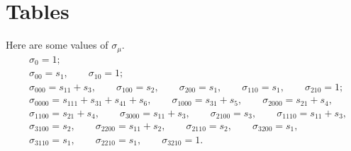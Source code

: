 \documentclass[12pt]{amsart}
\theoremstyle{plain}
\theoremstyle{definition}
\theoremstyle{remark}
\begin{document}
\section{Tables}
Here are some values of $\sigma_\mu$.
\begin{align*}
&\sigma_{0} =1; \\[8pt]
&\sigma_{00} =s_{1},\qquad   \sigma_{10} =1; \\[8pt] 
&\sigma_{000} =s_{11} + s_{3},\qquad   
\sigma_{100} =s_{2},\qquad    
\sigma_{200} =s_{1},\qquad    
\sigma_{110} =s_{1},\qquad    
\sigma_{210} =1;\\[8pt] 
&\sigma_{0000} =s_{111} + s_{31} + s_{41} + s_{6},\qquad 
\sigma_{1000} =s_{31} + s_{5},\qquad 
\sigma_{2000} =s_{21} + s_{4},\\ 
&\sigma_{1100} =s_{21} + s_{4},\qquad 
\sigma_{3000} =s_{11} + s_{3},\qquad 
\sigma_{2100} =s_{3},\qquad 
\sigma_{1110} =s_{11} + s_{3},\\ 
&\sigma_{3100} =s_{2},\qquad  
\sigma_{2200} =s_{11} + s_{2},\qquad  
\sigma_{2110} =s_{2},\qquad  
\sigma_{3200} =s_{1},\\
&\sigma_{3110} =s_{1},\qquad  
\sigma_{2210} =s_{1},\qquad 
\sigma_{3210} =1.
\end{align*}

%  
%

 
\def\auteur#1{{\sc #1}}
\def\titreref#1{{\em #1}}
\def\vol#1{{\bf #1}}
\end{document}
